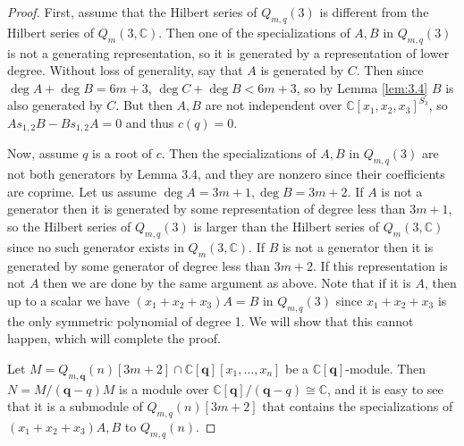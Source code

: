 \documentclass[11pt]{article}
\theoremstyle{definition}
\newcommand{\C}{\mathbb{C}}
\renewcommand{\b}[1]{\textbf{#1}}
\begin{document}
\begin{proof}
    First, assume that the Hilbert series of $Q_{m,q}(3)$ is different from the Hilbert series of $Q_m(3,\C)$. Then one of the specializations of $A,B$ in $Q_{m,q}(3)$ is not a generating representation, so it is generated by a representation of lower degree. Without loss of generality, say that $A$ is generated by $C$. Then since $\deg A+\deg B=6m+3$, $\deg C+\deg B<6m+3$, so by Lemma \ref{lem:3.4} $B$ is also generated by $C$. But then $A,B$ are not independent over $\C[x_1,x_2,x_3]^{S_3}$, so $As_{1,2}B-Bs_{1,2}A=0$ and thus $c(q)=0$.
    
    Now, assume $q$ is a root of $c$. Then the specializations of $A,B$ in $Q_{m,q}(3)$ are not both generators by Lemma 3.4, and they are nonzero since their coefficients are coprime. Let us assume \linebreak
    $\deg A=3m+1,\deg B=3m+2$. If $A$ is not a generator then it is generated by some representation of degree less than $3m+1$, so the Hilbert series of $Q_{m,q}(3)$ is larger than the Hilbert series of $Q_m(3,\C)$ since no such generator exists in $Q_m(3,\C)$. If $B$ is not a generator then it is generated by some generator of degree less than $3m+2$. If this representation is not $A$ then we are done by the same argument as above. Note that if it is $A$, then up to a scalar we have $(x_1+x_2+x_3)A=B$ in $Q_{m,q}(3)$ since $x_1+x_2+x_3$ is the only symmetric polynomial of degree 1. We will show that this cannot happen, which will complete the proof.
    
    Let $M=Q_{m,\b{q}}(n)[3m+2]\cap\C[\b{q}][x_1,\dots,x_n]$ be a $\C[\b{q}]$-module. Then $N=M/(\b{q}-q)M$ is a module over $\C[\b{q}]/(\b{q}-q)\cong\C$, and it is easy to see that it is a submodule of $Q_{m,q}(n)[3m+2]$ that contains the specializations of $(x_1+x_2+x_3)A,B$ to $Q_{m,q}(n)$. 
    

\end{proof}
\end{document}
